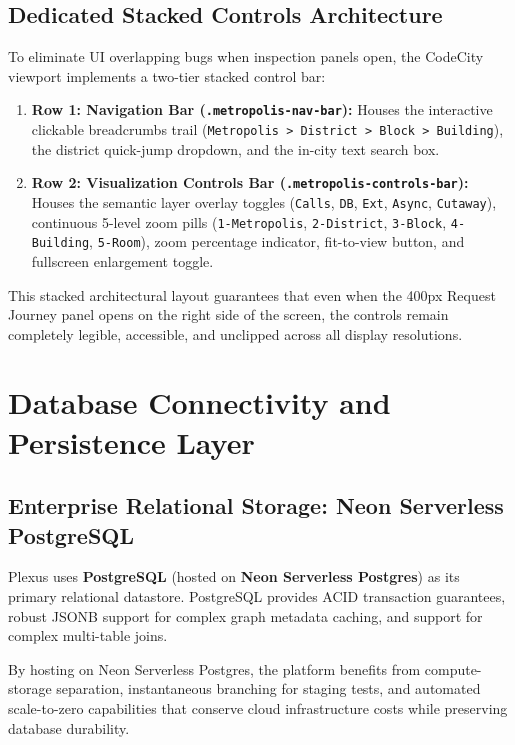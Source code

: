 \documentclass[11pt,a4paper,openany]{report}
\begin{document}
\section{Dedicated Stacked Controls Architecture}
To eliminate UI overlapping bugs when inspection panels open, the CodeCity viewport implements a two-tier stacked control bar:
\begin{enumerate}[leftmargin=1.2cm]
    \item \textbf{Row 1: Navigation Bar (\texttt{.metropolis-nav-bar}):} Houses the interactive clickable breadcrumbs trail (\texttt{Metropolis > District > Block > Building}), the district quick-jump dropdown, and the in-city text search box.
    \item \textbf{Row 2: Visualization Controls Bar (\texttt{.metropolis-controls-bar}):} Houses the semantic layer overlay toggles (\texttt{Calls}, \texttt{DB}, \texttt{Ext}, \texttt{Async}, \texttt{Cutaway}), continuous 5-level zoom pills (\texttt{1-Metropolis}, \texttt{2-District}, \texttt{3-Block}, \texttt{4-Building}, \texttt{5-Room}), zoom percentage indicator, fit-to-view button, and fullscreen enlargement toggle.
\end{enumerate}

This stacked architectural layout guarantees that even when the 400px Request Journey panel opens on the right side of the screen, the controls remain completely legible, accessible, and unclipped across all display resolutions.


\chapter{Database Connectivity and Persistence Layer}

\section{Enterprise Relational Storage: Neon Serverless PostgreSQL}
Plexus uses \textbf{PostgreSQL} (hosted on \textbf{Neon Serverless Postgres}) as its primary relational datastore. PostgreSQL provides ACID transaction guarantees, robust JSONB support for complex graph metadata caching, and support for complex multi-table joins.

By hosting on Neon Serverless Postgres, the platform benefits from compute-storage separation, instantaneous branching for staging tests, and automated scale-to-zero capabilities that conserve cloud infrastructure costs while preserving database durability.
\end{document}
